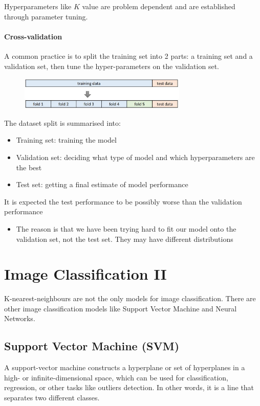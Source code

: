\documentclass{report}
\begin{document}
Hyperparameters like $K$ value are problem dependent and are established through
parameter tuning.

\subsubsection{Cross-validation}

A common practice is to split the training set into 2 parts: a training set and
a validation set, then tune the hyper-parameters on the validation set.
\begin{figure}[h]
    \centering
    \includegraphics[width=8cm]{cross.JPG}
\end{figure}

The dataset split is summarised into:
\begin{itemize}
    \item Training set: training the model
    \item Validation set: deciding what type of model and which hyperparameters are the
    best
    \item Test set: getting a final estimate of model performance
\end{itemize}

It is expected the test performance to be possibly worse than the validation
performance
\begin{itemize}
    \item The reason is that we have been trying hard to fit our model onto the validation set,
    not the test set. They may have different distributions
\end{itemize}
\chapter{Image Classification II}

K-nearest-neighbours are not the only models for image classification. There are
other image classification models like Support Vector Machine and Neural
Networks.  

\section{Support Vector Machine (SVM)}

A support-vector machine constructs a hyperplane or set of
hyperplanes in a high- or infinite-dimensional space, which can be used for
classification, regression, or other tasks like outliers detection. In other
words, it is a line that separates two different classes.
\end{document}
